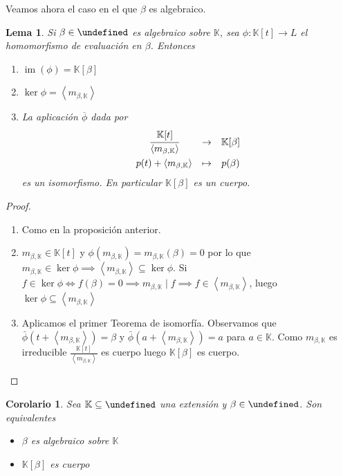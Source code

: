 \documentclass[10pt, spanish]{report}
\newtheorem*{lema}{Lema}
\newtheorem*{cor}{Corolario}
\theoremstyle{definition}
\newcommand{\K}{\mathbb{K}}
\let\L\undefined
\newcommand{\L}{\mathbb{L}}
\newcommand{\im}[1]{\operatorname{im}\left(#1\right)}
\begin{document}
Veamos ahora el caso en el que $\beta$ es algebraico.

\begin{lema}
    Si $\beta\in\L$ es algebraico sobre $\K$, sea $\phi:\K[t]\to L$ el
    homomorfismo de evaluación en $\beta$. Entonces
    \begin{enumerate}
        \item $\im{\phi}=\K[\beta]$
        \item $\ker{\phi}=\left<m_{\beta,\K}\right>$
        \item La aplicación $\overline{\phi}$ dada por
            \[\begin{matrix*}
                \cfrac{\K[t]}{\left<m_{\beta,\K}\right>}&\to&\K[\beta]\\[1em]
                p(t)+\left< m_{\beta,\K} \right>&\mapsto&p(\beta)
            \end{matrix*}\]
            es un isomorfismo. En particular $\K[\beta]$ es un cuerpo.
    \end{enumerate}
\end{lema}

\begin{proof}\hspace{0pt}
    \begin{enumerate}
        \item Como en la proposición anterior.
        \item $m_{\beta,\K}\in\K[t]$ y $\phi(m_{\beta,\K})=m_{\beta,\K}(\beta)
            =0$ por lo que $m_{\beta,\K}\in \ker{\phi} \implies \left<
            m_{\beta,\K} \right> \subseteq \ker{\phi}$. Si $f\in\ker{\phi}
            \Leftrightarrow f(\beta)=0 \implies m_{\beta,\K}\mid f \implies f\in
            \left< m_{\beta,\K}\right> $, luego $\ker{\phi}\subseteq\left<
            m_{\beta,\K} \right> $
        \item Aplicamos el primer Teorema de isomorfía. Observamos que
            $\bar{\phi}(t+\left< m_{\beta,\K} \right>)=\beta$ y
            $\bar{\phi}(a+\left< m_{\beta,\K} \right>)=a$ para $a\in\K$. Como
            $m_{\beta,\K}$ es irreducible $\frac{\K[t]}{\left< m_{\beta,\K}
            \right> }$ es cuerpo luego $\K[\beta]$ es cuerpo.
    \end{enumerate}
    \vspace{-2em}
\end{proof}

\begin{cor}
    Sea $\K\subseteq\L$ una extensión y $\beta\in \L$. Son equivalentes
    \begin{itemize}
        \item $\beta$ es algebraico sobre $\K$
        \item $\K[\beta]$ es cuerpo
    \end{itemize}
\end{cor}
\end{document}
